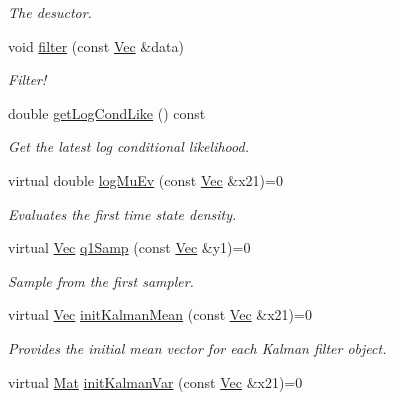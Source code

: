 \begin{DoxyCompactItemize}
\begin{DoxyCompactList}\small\item\em The desuctor. \end{DoxyCompactList}\item 
void \hyperlink{classKalman__RBPF__SISR_a9bd231a07aaa7fe3cf322aa7e2eeb1af}{filter} (const \hyperlink{apf__filter_8h_a4c7df05c6f5e8a0d15ae14bcdbc07152}{Vec} \&data)
\begin{DoxyCompactList}\small\item\em Filter! \end{DoxyCompactList}\item 
double \hyperlink{classKalman__RBPF__SISR_a6c4384cd9e9f6122ce96b3878dbc4f4c}{get\+Log\+Cond\+Like} () const 
\begin{DoxyCompactList}\small\item\em Get the latest log conditional likelihood. \end{DoxyCompactList}\item 
virtual double \hyperlink{classKalman__RBPF__SISR_a803770c8dfe0d0bfca986e1110f196de}{log\+Mu\+Ev} (const \hyperlink{apf__filter_8h_a4c7df05c6f5e8a0d15ae14bcdbc07152}{Vec} \&x21)=0
\begin{DoxyCompactList}\small\item\em Evaluates the first time state density. \end{DoxyCompactList}\item 
virtual \hyperlink{apf__filter_8h_a4c7df05c6f5e8a0d15ae14bcdbc07152}{Vec} \hyperlink{classKalman__RBPF__SISR_aa84b58ae30f92d7ee659ae2f2b45c263}{q1\+Samp} (const \hyperlink{apf__filter_8h_a4c7df05c6f5e8a0d15ae14bcdbc07152}{Vec} \&y1)=0
\begin{DoxyCompactList}\small\item\em Sample from the first sampler. \end{DoxyCompactList}\item 
virtual \hyperlink{apf__filter_8h_a4c7df05c6f5e8a0d15ae14bcdbc07152}{Vec} \hyperlink{classKalman__RBPF__SISR_afe95bb7f338dedf644fe13b7a5416841}{init\+Kalman\+Mean} (const \hyperlink{apf__filter_8h_a4c7df05c6f5e8a0d15ae14bcdbc07152}{Vec} \&x21)=0
\begin{DoxyCompactList}\small\item\em Provides the initial mean vector for each Kalman filter object. \end{DoxyCompactList}\item 
virtual \hyperlink{apf__filter_8h_ae601f56a556993079f730483c574356f}{Mat} \hyperlink{classKalman__RBPF__SISR_ac8be6c3f22958fa47ba8b033059678b9}{init\+Kalman\+Var} (const \hyperlink{apf__filter_8h_a4c7df05c6f5e8a0d15ae14bcdbc07152}{Vec} \&x21)=0

\end{DoxyCompactItemize}
